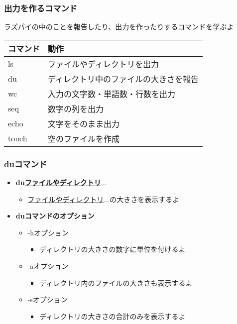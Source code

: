 \begin{frame}
    \frametitle{出力を作るコマンド}
    ラズパイの中のことを報告したり、出力を作ったりするコマンドを学ぶよ\\
    \vspace{\zh}
    \begin{tabular}{ll}
        コマンド  & 動作                                \\ \hline
        ls       & ファイルやディレクトリを出力          \\
        du       & ディレクトリ中のファイルの大きさを報告 \\
        wc       & 入力の文字数・単語数・行数を出力      \\
        seq      & 数字の列を出力                        \\
        echo     & 文字をそのまま出力                    \\ 
        touch    & 空のファイルを作成                    \\\hline
    \end{tabular}
\end{frame}

\begin{frame}
    \frametitle{duコマンド}
    \begin{itemize}
        \item {\bf du\textvisiblespace\underline{ファイルやディレクトリ}$\ldots$}
        \begin{itemize}
            \small
            \item[] \underline{ファイルやディレクトリ}$\ldots$の大きさを表示するよ
        \end{itemize}
        \item {\bf duコマンドのオプション}
        \begin{itemize}
            \small
            \item  -hオプション
           \begin{itemize}
                \item[] ディレクトリの大きさの数字に単位を付けるよ
            \end{itemize}
            \item -aオプション
            \begin{itemize}
               \item[] ディレクトリ内のファイルの大きさも表示するよ
            \end{itemize}
            \item -sオプション
            \begin{itemize}
                \item[] ディレクトリの大きさの合計のみを表示するよ
            \end{itemize}
        \end{itemize}
    \end{itemize}
\end{frame}

